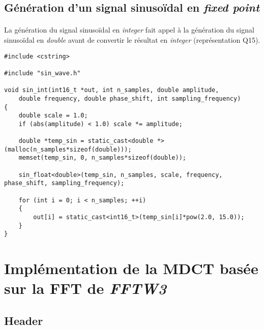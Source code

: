 \documentclass{article}
\begin{document}
\subsection{Génération d'un signal sinusoïdal en \emph{fixed point}}\label{app:run_ref_mdct_fint}
\paragraph{}
La génération du signal sinusoïdal en \emph{integer} fait appel à la génération du signal sinusoïdal en \emph{double} avant de convertir le résultat en \emph{integer} (représentation Q15).
\lstset{language=C++}
\begin{lstlisting}
#include <cstring>

#include "sin_wave.h"

void sin_int(int16_t *out, int n_samples, double amplitude,
    double frequency, double phase_shift, int sampling_frequency)
{
    double scale = 1.0;
    if (abs(amplitude) < 1.0) scale *= amplitude;

    double *temp_sin = static_cast<double *>(malloc(n_samples*sizeof(double)));
    memset(temp_sin, 0, n_samples*sizeof(double));

    sin_float<double>(temp_sin, n_samples, scale, frequency, phase_shift, sampling_frequency);

    for (int i = 0; i < n_samples; ++i)
    {
        out[i] = static_cast<int16_t>(temp_sin[i]*pow(2.0, 15.0));
    }
}
\end{lstlisting}




\newpage
\section{Implémentation de la MDCT basée sur la FFT de \emph{FFTW3}}\label{app:mdct_fftw3_f32}
\subsection{Header}\label{app:mdct_fftw3_f32_header}
\end{document}
